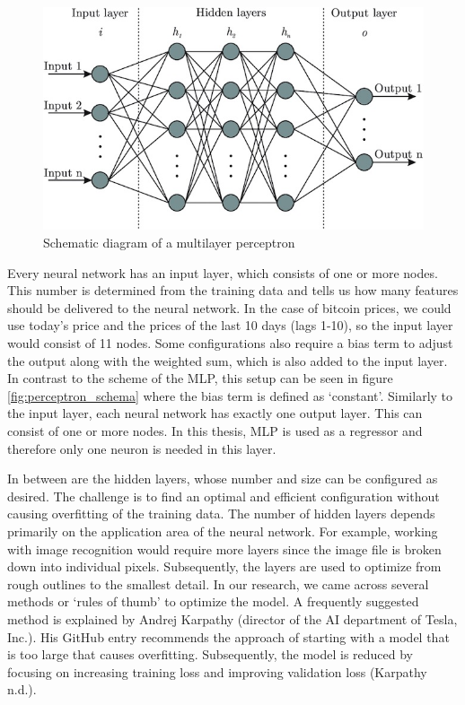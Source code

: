 \documentclass[
]{article}
\begin{document}
\begin{figure}

{\centering \includegraphics[width=0.6\linewidth]{images/MLP} 

}

\caption{Schematic diagram of a multilayer perceptron}\label{fig:mlp_schema}
\end{figure}

Every neural network has an input layer, which consists of one or more
nodes. This number is determined from the training data and tells us how
many features should be delivered to the neural network. In the case of
bitcoin prices, we could use today's price and the prices of the last 10
days (lags 1-10), so the input layer would consist of 11 nodes. Some
configurations also require a bias term to adjust the output along with
the weighted sum, which is also added to the input layer. In contrast to
the scheme of the MLP, this setup can be seen in figure
\ref{fig:perceptron_schema} where the bias term is defined as
`constant'. Similarly to the input layer, each neural network has
exactly one output layer. This can consist of one or more nodes. In this
thesis, MLP is used as a regressor and therefore only one neuron is
needed in this layer.

In between are the hidden layers, whose number and size can be
configured as desired. The challenge is to find an optimal and efficient
configuration without causing overfitting of the training data. The
number of hidden layers depends primarily on the application area of the
neural network. For example, working with image recognition would
require more layers since the image file is broken down into individual
pixels. Subsequently, the layers are used to optimize from rough
outlines to the smallest detail. In our research, we came across several
methods or `rules of thumb' to optimize the model. A frequently
suggested method is explained by Andrej Karpathy (director of the AI
department of Tesla, Inc.). His GitHub entry recommends the approach of
starting with a model that is too large that causes overfitting.
Subsequently, the model is reduced by focusing on increasing training
loss and improving validation loss (Karpathy n.d.).
\end{document}
